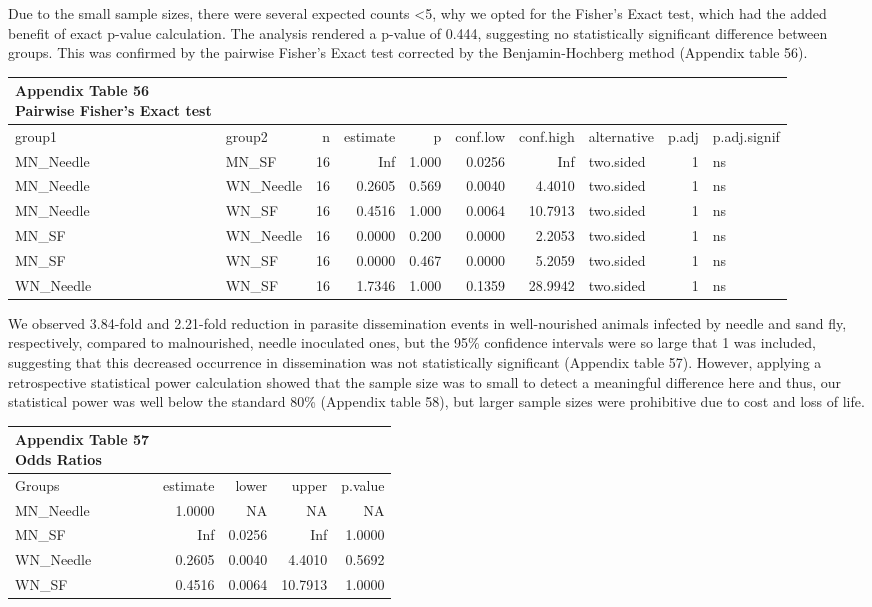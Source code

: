 \documentclass[
  12pt,
  letterpaper,
]{article}
\begin{document}
Due to the small sample sizes, there were several expected counts \textless5, why we opted for the Fisher's Exact test, which had the added benefit of exact p-value calculation. The analysis rendered a p-value of 0.444, suggesting no statistically significant difference between groups. This was confirmed by the pairwise Fisher's Exact test corrected by the Benjamin-Hochberg method (Appendix table 56).

\begin{longtable}{llrrrrrlrl}
\caption*{
{\large \textbf{Appendix Table 56}} \\ 
{\small \textbf{Pairwise Fisher's Exact test}}
} \\ 
\toprule
group1 & group2 & n & estimate & p & conf.low & conf.high & alternative & p.adj & p.adj.signif \\ 
\midrule\addlinespace[2.5pt]
MN\_Needle & MN\_SF & 16 & Inf & 1.000 & 0.0256 & Inf & two.sided & 1 & ns \\ 
MN\_Needle & WN\_Needle & 16 & 0.2605 & 0.569 & 0.0040 & 4.4010 & two.sided & 1 & ns \\ 
MN\_Needle & WN\_SF & 16 & 0.4516 & 1.000 & 0.0064 & 10.7913 & two.sided & 1 & ns \\ 
MN\_SF & WN\_Needle & 16 & 0.0000 & 0.200 & 0.0000 & 2.2053 & two.sided & 1 & ns \\ 
MN\_SF & WN\_SF & 16 & 0.0000 & 0.467 & 0.0000 & 5.2059 & two.sided & 1 & ns \\ 
WN\_Needle & WN\_SF & 16 & 1.7346 & 1.000 & 0.1359 & 28.9942 & two.sided & 1 & ns \\ 
\bottomrule
\end{longtable}

We observed 3.84-fold and 2.21-fold reduction in parasite dissemination events in well-nourished animals infected by needle and sand fly, respectively, compared to malnourished, needle inoculated ones, but the 95\% confidence intervals were so large that 1 was included, suggesting that this decreased occurrence in dissemination was not statistically significant (Appendix table 57). However, applying a retrospective statistical power calculation showed that the sample size was to small to detect a meaningful difference here and thus, our statistical power was well below the standard 80\% (Appendix table 58), but larger sample sizes were prohibitive due to cost and loss of life.

\begin{longtable}{l|rrrr}
\caption*{
{\large \textbf{Appendix Table 57}} \\ 
{\small \textbf{Odds Ratios}}
} \\ 
\toprule
\multicolumn{1}{l}{Groups} & estimate & lower & upper & p.value \\ 
\midrule\addlinespace[2.5pt]
MN\_Needle & 1.0000 & NA & NA & NA \\ 
MN\_SF &    Inf & 0.0256 &     Inf & 1.0000 \\ 
WN\_Needle & 0.2605 & 0.0040 &  4.4010 & 0.5692 \\ 
WN\_SF & 0.4516 & 0.0064 & 10.7913 & 1.0000 \\ 
\bottomrule
\end{longtable}
\end{document}

